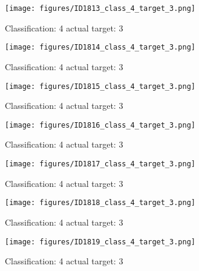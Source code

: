 \begin{figure}[h!]
\begin{center}
\texttt{[image: figures/ID1813\_class\_4\_target\_3.png]}
\end{center}
\caption{ Classification: 4 actual target: 3}
\label{fig:ID1813_class_4_target_3}
\end{figure}
\begin{figure}[h!]
\begin{center}
\texttt{[image: figures/ID1814\_class\_4\_target\_3.png]}
\end{center}
\caption{ Classification: 4 actual target: 3}
\label{fig:ID1814_class_4_target_3}
\end{figure}
\begin{figure}[h!]
\begin{center}
\texttt{[image: figures/ID1815\_class\_4\_target\_3.png]}
\end{center}
\caption{ Classification: 4 actual target: 3}
\label{fig:ID1815_class_4_target_3}
\end{figure}
\begin{figure}[h!]
\begin{center}
\texttt{[image: figures/ID1816\_class\_4\_target\_3.png]}
\end{center}
\caption{ Classification: 4 actual target: 3}
\label{fig:ID1816_class_4_target_3}
\end{figure}
\begin{figure}[h!]
\begin{center}
\texttt{[image: figures/ID1817\_class\_4\_target\_3.png]}
\end{center}
\caption{ Classification: 4 actual target: 3}
\label{fig:ID1817_class_4_target_3}
\end{figure}
\begin{figure}[h!]
\begin{center}
\texttt{[image: figures/ID1818\_class\_4\_target\_3.png]}
\end{center}
\caption{ Classification: 4 actual target: 3}
\label{fig:ID1818_class_4_target_3}
\end{figure}
\begin{figure}[h!]
\begin{center}
\texttt{[image: figures/ID1819\_class\_4\_target\_3.png]}
\end{center}
\caption{ Classification: 4 actual target: 3}
\label{fig:ID1819_class_4_target_3}
\end{figure}
